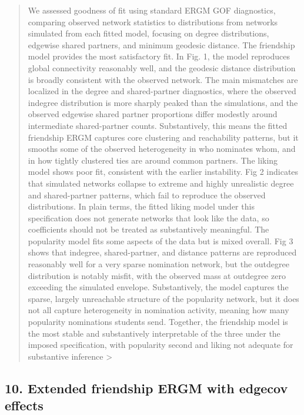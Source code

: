 \documentclass[
  letterpaper,
  DIV=11,
  numbers=noendperiod]{scrartcl}
\begin{document}
\begin{quote}
We assessed goodness of fit using standard ERGM GOF diagnostics,
comparing observed network statistics to distributions from networks
simulated from each fitted model, focusing on degree distributions,
edgewise shared partners, and minimum geodesic distance. The friendship
model provides the most satisfactory fit. In Fig. 1, the model
reproduces global connectivity reasonably well, and the geodesic
distance distribution is broadly consistent with the observed network.
The main mismatches are localized in the degree and shared-partner
diagnostics, where the observed indegree distribution is more sharply
peaked than the simulations, and the observed edgewise shared partner
proportions differ modestly around intermediate shared-partner counts.
Substantively, this means the fitted friendship ERGM captures core
clustering and reachability patterns, but it smooths some of the
observed heterogeneity in who nominates whom, and in how tightly
clustered ties are around common partners. The liking model shows poor
fit, consistent with the earlier instability. Fig 2 indicates that
simulated networks collapse to extreme and highly unrealistic degree and
shared-partner patterns, which fail to reproduce the observed
distributions. In plain terms, the fitted liking model under this
specification does not generate networks that look like the data, so
coefficients should not be treated as substantively meaningful. The
popularity model fits some aspects of the data but is mixed overall. Fig
3 shows that indegree, shared-partner, and distance patterns are
reproduced reasonably well for a very sparse nomination network, but the
outdegree distribution is notably misfit, with the observed mass at
outdegree zero exceeding the simulated envelope. Substantively, the
model captures the sparse, largely unreachable structure of the
popularity network, but it does not all capture heterogeneity in
nomination activity, meaning how many popularity nominations students
send. Together, the friendship model is the most stable and
substantively interpretable of the three under the imposed
specification, with popularity second and liking not adequate for
substantive inference \textgreater{}
\end{quote}

\subsection{10. Extended friendship ERGM with edgecov
effects}\label{extended-friendship-ergm-with-edgecov-effects}
\end{document}
